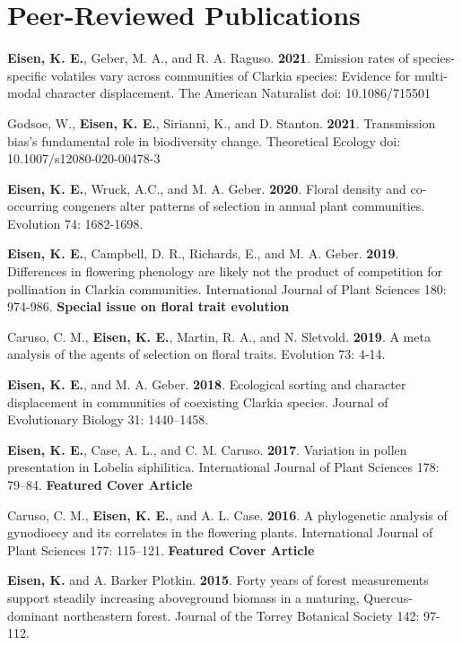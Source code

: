 \documentclass[letterpaper,11pt]{article}
\begin{document}
\section{Peer-Reviewed Publications}
\begin{etaremune}
\item \textbf{Eisen, K. E.}, Geber, M. A., and R. A. Raguso. \textbf{2021}. Emission rates of species-specific volatiles vary across communities of Clarkia species: Evidence for multi-modal character displacement. The American Naturalist doi: 10.1086/715501\\
\item Godsoe, W., \textbf{Eisen, K. E.}, Sirianni, K., and D. Stanton. \textbf{2021}. Transmission bias's fundamental role in biodiversity change. Theoretical Ecology doi: 10.1007/s12080-020-00478-3 \\
\item \textbf{Eisen, K. E.}, Wruck, A.C., and M. A. Geber. \textbf{2020}. Floral density and co-occurring congeners alter patterns of selection in annual plant communities. Evolution 74: 1682-1698. \\
\item \textbf{Eisen, K. E.}, Campbell, D. R., Richards, E., and M. A. Geber. \textbf{2019}. Differences in flowering phenology are likely not the product of competition for pollination in Clarkia communities. International Journal of Plant Sciences 180: 974-986. \textbf{Special issue on floral trait evolution}\\
\item Caruso, C. M., \textbf{Eisen, K. E.}, Martin, R. A., and N. Sletvold. \textbf{2019}. A meta analysis of the agents of selection on floral traits. Evolution 73: 4-14.\\
\item \textbf{Eisen, K. E.}, and M. A. Geber. \textbf{2018}. Ecological sorting and character displacement in communities of coexisting Clarkia species. Journal of Evolutionary Biology 31: 1440–1458.\\
\item \textbf{Eisen, K. E.}, Case, A. L., and C. M. Caruso. \textbf{2017}. Variation in pollen presentation in Lobelia siphilitica. International Journal of Plant Sciences 178: 79–84. \textbf{Featured Cover Article}\\
\item Caruso, C. M., \textbf{Eisen, K. E.}, and A. L. Case. \textbf{2016}. A phylogenetic analysis of gynodioecy and its correlates in the flowering plants. International Journal of Plant Sciences 177: 115–121. \textbf{Featured Cover Article}\\
\newpage
\vspace*{2mm}
\item \textbf{Eisen, K.} and A. Barker Plotkin. \textbf{2015}. Forty years of forest measurements support steadily increasing aboveground biomass in a maturing, Quercus-dominant northeastern forest. Journal of the Torrey Botanical Society 142: 97-112.
\end{etaremune}
\end{document}

